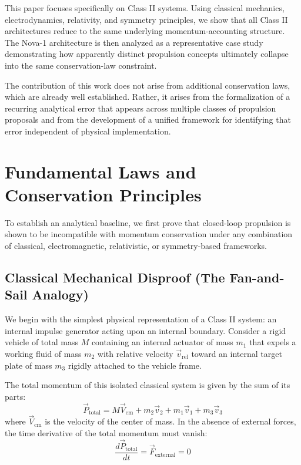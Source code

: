 \documentclass[journal,10pt,twoside]{IEEEtran}
\begin{document}
This paper focuses specifically on Class II systems. Using classical mechanics, electrodynamics, relativity, and symmetry principles, we show that all Class II architectures reduce to the same underlying momentum-accounting structure. The Nova-1 architecture is then analyzed as a representative case study demonstrating how apparently distinct propulsion concepts ultimately collapse into the same conservation-law constraint.

The contribution of this work does not arise from additional conservation laws, which are already well established. Rather, it arises from the formalization of a recurring analytical error that appears across multiple classes of propulsion proposals and from the development of a unified framework for identifying that error independent of physical implementation.

\section{Fundamental Laws and Conservation Principles}
\label{sec:fundamental_laws}

To establish an analytical baseline, we first prove that closed-loop propulsion is shown to be incompatible with momentum conservation under any combination of classical, electromagnetic, relativistic, or symmetry-based frameworks.

\subsection{Classical Mechanical Disproof (The Fan-and-Sail Analogy)}
We begin with the simplest physical representation of a Class II system: an internal impulse generator acting upon an internal boundary. Consider a rigid vehicle of total mass $M$ containing an internal actuator of mass $m_1$ that expels a working fluid of mass $m_2$ with relative velocity $\vec{v}_{\text{rel}}$ toward an internal target plate of mass $m_3$ rigidly attached to the vehicle frame.

The total momentum of this isolated classical system is given by the sum of its parts:
\begin{equation}
\vec{P}_{\text{total}} = M\vec{V}_{\text{cm}} + m_2\vec{v}_2 + m_1\vec{v}_1 + m_3\vec{v}_3
\label{eq:classical_mom_total}
\end{equation}
where $\vec{V}_{\text{cm}}$ is the velocity of the center of mass. In the absence of external forces, the time derivative of the total momentum must vanish:
\begin{equation}
\frac{d\vec{P}_{\text{total}}}{dt} = \vec{F}_{\text{external}} = 0
\label{eq:classical_force_ext}
\end{equation}
\end{document}
